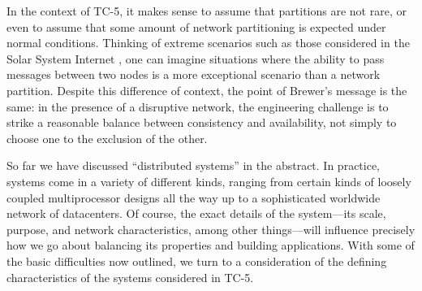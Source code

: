 In the context of TC-5, it makes sense to assume that partitions are not rare, or even to assume that some amount of network partitioning is expected under normal conditions. Thinking of extreme scenarios such as those considered in the Solar System Internet \cite{2016nasaSSI}, one can imagine situations where the ability to pass messages between two nodes is a more exceptional scenario than a network partition. Despite this difference of context, the point of Brewer's message is the same: in the presence of a disruptive network, the engineering challenge is to strike a reasonable balance between consistency and availability, not simply to choose one to the exclusion of the other.

So far we have discussed ``distributed systems'' in the abstract. In practice, systems come in a variety of different kinds, ranging from certain kinds of loosely coupled multiprocessor designs all the way up to a sophisticated worldwide network of datacenters. Of course, the exact details of the system---its scale, purpose, and network characteristics, among other things---will influence precisely how we go about balancing its properties and building applications. With some of the basic difficulties now outlined, we turn to a consideration of the defining characteristics of the systems considered in TC-5.


